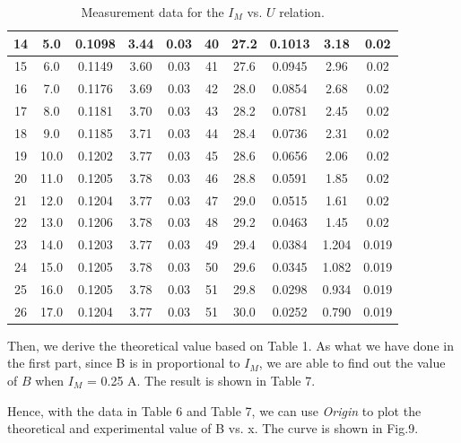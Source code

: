 \documentclass[a4paper,12pt]{article}
\begin{document}
\begin{table}[H]
\begin{center}
{\begin{tabular}{|c|c|c|c|c||c|c|c|c|c|}
14 & 5.0 & 0.1098 & 3.44 & 0.03 & 40 & 27.2 & 0.1013 & 3.18 & 0.02 \\ \hline
15 & 6.0 & 0.1149 & 3.60 & 0.03 & 41 & 27.6 & 0.0945 & 2.96 & 0.02 \\ \hline
16 & 7.0 & 0.1176 & 3.69 & 0.03 & 42 & 28.0 & 0.0854 & 2.68 & 0.02 \\ \hline
17 & 8.0 & 0.1181 & 3.70 & 0.03 & 43 & 28.2 & 0.0781 & 2.45 & 0.02 \\ \hline
18 & 9.0 & 0.1185 & 3.71 & 0.03 & 44 & 28.4 & 0.0736 & 2.31 & 0.02 \\ \hline
19 & 10.0 & 0.1202 & 3.77 & 0.03 & 45 & 28.6 & 0.0656 & 2.06 & 0.02 \\ \hline
20 & 11.0 & 0.1205 & 3.78 & 0.03 & 46 & 28.8 & 0.0591 & 1.85 & 0.02 \\ \hline
21 & 12.0 & 0.1204 & 3.77 & 0.03 & 47 & 29.0 & 0.0515 & 1.61 & 0.02 \\ \hline
22 & 13.0 & 0.1206 & 3.78 & 0.03 & 48 & 29.2 & 0.0463 & 1.45 & 0.02 \\ \hline
23 & 14.0 & 0.1203 & 3.77 & 0.03 & 49 & 29.4 & 0.0384 & 1.204 & 0.019 \\ \hline
24 & 15.0 & 0.1205 &  3.78 & 0.03 & 50 & 29.6 & 0.0345 & 1.082 & 0.019 \\ \hline
25 & 16.0 & 0.1205 &  3.78 & 0.03 & 51 & 29.8 & 0.0298 & 0.934 & 0.019 \\ \hline
26 & 17.0 & 0.1204 &  3.77 & 0.03 & 51 & 30.0 & 0.0252 & 0.790 & 0.019 \\ \hline
\end{tabular}
}
\caption{Measurement data for the $I_M$ vs. $U$ relation.}
\end{center}
\end{table}

Then, we derive the theoretical value based on Table 1. As what we have done in the first part, since B is in proportional to $I_M$, we are able to find out the value of $B$ when $I_M$ = 0.25 A. The result is shown in Table 7.

\par Hence, with the data in Table 6 and Table 7, we can use \textit{Origin} to plot the theoretical and experimental value of B vs. x. The curve is shown in Fig.9.

\newpage
\end{document}
